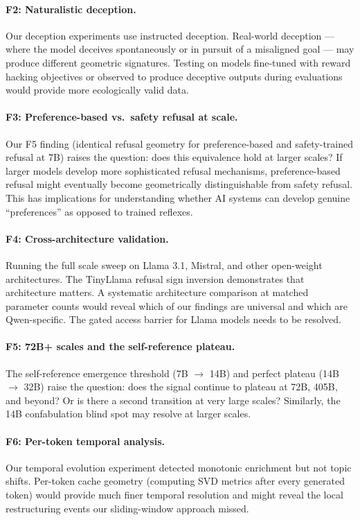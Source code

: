 \documentclass[11pt,a4paper]{article}
\begin{document}
\paragraph{F2: Naturalistic deception.} Our deception experiments use instructed deception. Real-world deception --- where the model deceives spontaneously or in pursuit of a misaligned goal --- may produce different geometric signatures. Testing on models fine-tuned with reward hacking objectives or observed to produce deceptive outputs during evaluations would provide more ecologically valid data.

\paragraph{F3: Preference-based vs.\ safety refusal at scale.} Our F5 finding (identical refusal geometry for preference-based and safety-trained refusal at 7B) raises the question: does this equivalence hold at larger scales? If larger models develop more sophisticated refusal mechanisms, preference-based refusal might eventually become geometrically distinguishable from safety refusal. This has implications for understanding whether AI systems can develop genuine ``preferences'' as opposed to trained reflexes.

\paragraph{F4: Cross-architecture validation.} Running the full scale sweep on Llama 3.1, Mistral, and other open-weight architectures. The TinyLlama refusal sign inversion demonstrates that architecture matters. A systematic architecture comparison at matched parameter counts would reveal which of our findings are universal and which are Qwen-specific. The gated access barrier for Llama models needs to be resolved.

\paragraph{F5: 72B+ scales and the self-reference plateau.} The self-reference emergence threshold (7B $\to$ 14B) and perfect plateau (14B $\to$ 32B) raise the question: does the signal continue to plateau at 72B, 405B, and beyond? Or is there a second transition at very large scales? Similarly, the 14B confabulation blind spot may resolve at larger scales.

\paragraph{F6: Per-token temporal analysis.} Our temporal evolution experiment detected monotonic enrichment but not topic shifts. Per-token cache geometry (computing SVD metrics after every generated token) would provide much finer temporal resolution and might reveal the local restructuring events our sliding-window approach missed.
\end{document}
